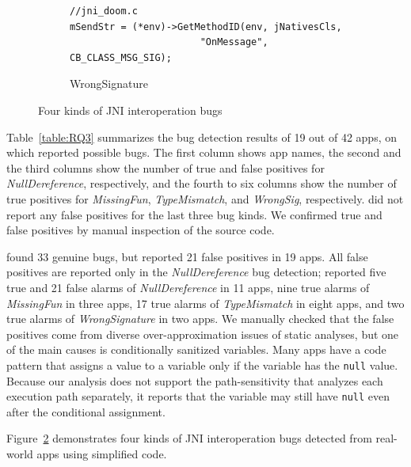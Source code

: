 \begin{figure}[t]
\begin{subfigure}[t]{0.5\textwidth}
\begin{lstlisting}[style=cpp,xleftmargin=2.5em]
//jni_doom.c
mSendStr = (*env)->GetMethodID(env, jNativesCls,
                       "OnMessage", CB_CLASS_MSG_SIG);
    \end{lstlisting}
    \vspace*{-.5em}
    \caption{WrongSignature}
    \label{fig:bug3}
  \end{subfigure}
  \vspace*{-.5em}
  \caption{Four kinds of JNI interoperation bugs}
  \vspace*{-1em}
  \label{fig:bugs}
\end{figure}

Table~\ref{table:RQ3} summarizes the bug detection results of 19 out of 42
apps, on which \ours reported possible bugs.  The first
column shows app names, the second and the third columns show the
number of true and false positives for {\it NullDereference}, respectively, and
the fourth to six columns show the number of true positives for {\it
MissingFun}, {\it TypeMismatch}, and {\it WrongSig}, respectively.
\ours did not report any false positives for the last three bug kinds.
We confirmed true and false positives by manual inspection of the source code. 

\ours found 33 genuine bugs, but reported 21 false positives in 19 apps.
All false positives are reported only in the {\it NullDereference} bug
detection; \ours reported five true and 21 false alarms of {\it
NullDereference} in 11 apps, nine true alarms of {\it MissingFun} in
three apps, 17 true alarms of {\it TypeMismatch} in eight apps, and two true
alarms of {\it WrongSignature} in two apps. We manually checked that the false
positives come from diverse over-approximation issues of static analyses, but
one of the main causes is conditionally sanitized variables.  Many apps
have a code pattern that assigns a value to a variable only if the variable has
the {\tt null} value. Because our analysis does not support the
path-sensitivity that analyzes each execution path separately, it reports that
the variable may still have {\tt null} even after the conditional assignment.

Figure~\ref{fig:bugs} demonstrates four kinds of JNI interoperation bugs \ours
detected from real-world apps using simplified code.

